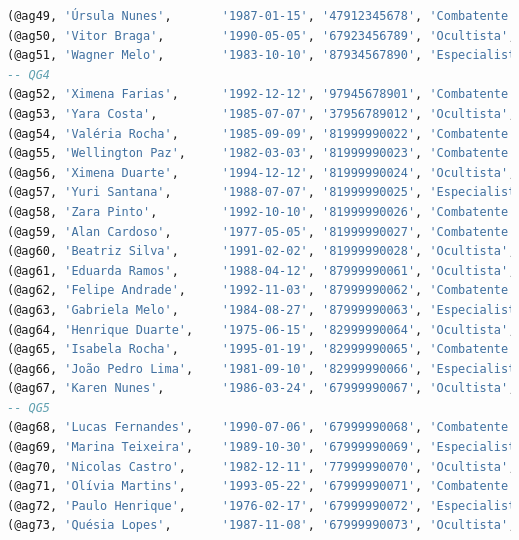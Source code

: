 \documentclass[12pt,a4paper]{report}
\begin{document}
\begin{lstlisting}[language=SQL, caption=population.sql]
(@ag49, 'Úrsula Nunes',       '1987-01-15', '47912345678', 'Combatente',  'Elite',    49, FALSE, FALSE), -- VER 3
(@ag50, 'Vitor Braga',        '1990-05-05', '67923456789', 'Ocultista',   'Veterano', 71, FALSE, FALSE),
(@ag51, 'Wagner Melo',        '1983-10-10', '87934567890', 'Especialista','Elite',    89, FALSE, FALSE),
-- QG4
(@ag52, 'Ximena Farias',      '1992-12-12', '97945678901', 'Combatente',  'Veterano', 54, FALSE, FALSE),
(@ag53, 'Yara Costa',         '1985-07-07', '37956789012', 'Ocultista',   'Recruta',  33, FALSE, FALSE),
(@ag54, 'Valéria Rocha',      '1985-09-09', '81999990022', 'Combatente',  'Recruta',  14, FALSE, FALSE),
(@ag55, 'Wellington Paz',     '1982-03-03', '81999990023', 'Combatente',  'Elite',    85, FALSE, TRUE),
(@ag56, 'Ximena Duarte',      '1994-12-12', '81999990024', 'Ocultista',   'Veterano', 53, TRUE,  FALSE),
(@ag57, 'Yuri Santana',       '1988-07-07', '81999990025', 'Especialista','Elite',    50, FALSE, TRUE), -- VER 4
(@ag58, 'Zara Pinto',         '1992-10-10', '81999990026', 'Combatente',  'Elite',    89, FALSE, TRUE),
(@ag59, 'Alan Cardoso',       '1977-05-05', '81999990027', 'Combatente',  'Veterano', 63, FALSE, FALSE),  
(@ag60, 'Beatriz Silva',      '1991-02-02', '81999990028', 'Ocultista',   'Recruta',  17, FALSE, FALSE),
(@ag61, 'Eduarda Ramos',      '1988-04-12', '87999990061', 'Ocultista',   'Recruta',  10, FALSE, FALSE),
(@ag62, 'Felipe Andrade',     '1992-11-03', '87999990062', 'Combatente',  'Veterano', 35, FALSE, FALSE),
(@ag63, 'Gabriela Melo',      '1984-08-27', '87999990063', 'Especialista','Veterano', 50, FALSE, FALSE),
(@ag64, 'Henrique Duarte',    '1975-06-15', '82999990064', 'Ocultista',   'Elite',    95, FALSE, TRUE),
(@ag65, 'Isabela Rocha',      '1995-01-19', '82999990065', 'Combatente',  'Recruta',  15, FALSE, FALSE),
(@ag66, 'João Pedro Lima',    '1981-09-10', '82999990066', 'Especialista','Veterano', 40, FALSE, FALSE),
(@ag67, 'Karen Nunes',        '1986-03-24', '67999990067', 'Ocultista',   'Veterano', 55, FALSE, FALSE),
-- QG5
(@ag68, 'Lucas Fernandes',    '1990-07-06', '67999990068', 'Combatente',   'Elite',    88, FALSE, FALSE),
(@ag69, 'Marina Teixeira',    '1989-10-30', '67999990069', 'Especialista', 'Veterano', 38, FALSE, FALSE),
(@ag70, 'Nicolas Castro',     '1982-12-11', '77999990070', 'Ocultista',    'Veterano', 65, FALSE, FALSE),
(@ag71, 'Olívia Martins',     '1993-05-22', '67999990071', 'Combatente',   'Recruta',  12, FALSE, FALSE),
(@ag72, 'Paulo Henrique',     '1976-02-17', '67999990072', 'Especialista', 'Elite',    91, FALSE, TRUE),
(@ag73, 'Quésia Lopes',       '1987-11-08', '67999990073', 'Ocultista',    'Veterano', 30, TRUE,  FALSE),

\end{lstlisting}
\end{document}
